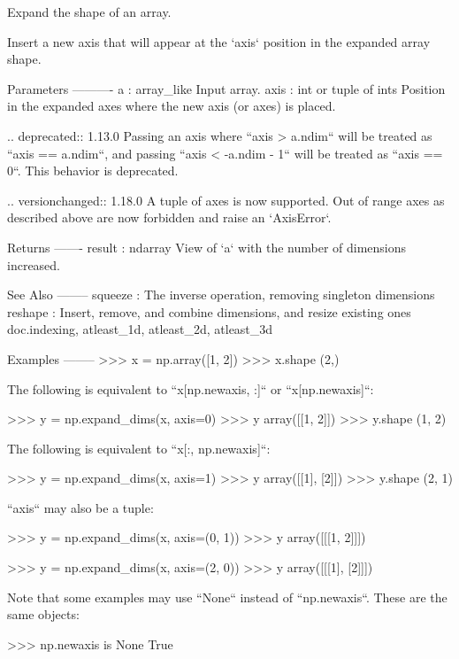 \begin{DoxyVerb}Expand the shape of an array.

Insert a new axis that will appear at the `axis` position in the expanded
array shape.

Parameters
----------
a : array_like
    Input array.
axis : int or tuple of ints
    Position in the expanded axes where the new axis (or axes) is placed.

    .. deprecated:: 1.13.0
        Passing an axis where ``axis > a.ndim`` will be treated as
        ``axis == a.ndim``, and passing ``axis < -a.ndim - 1`` will
        be treated as ``axis == 0``. This behavior is deprecated.

    .. versionchanged:: 1.18.0
        A tuple of axes is now supported.  Out of range axes as
        described above are now forbidden and raise an `AxisError`.

Returns
-------
result : ndarray
    View of `a` with the number of dimensions increased.

See Also
--------
squeeze : The inverse operation, removing singleton dimensions
reshape : Insert, remove, and combine dimensions, and resize existing ones
doc.indexing, atleast_1d, atleast_2d, atleast_3d

Examples
--------
>>> x = np.array([1, 2])
>>> x.shape
(2,)

The following is equivalent to ``x[np.newaxis, :]`` or ``x[np.newaxis]``:

>>> y = np.expand_dims(x, axis=0)
>>> y
array([[1, 2]])
>>> y.shape
(1, 2)

The following is equivalent to ``x[:, np.newaxis]``:

>>> y = np.expand_dims(x, axis=1)
>>> y
array([[1],
       [2]])
>>> y.shape
(2, 1)

``axis`` may also be a tuple:

>>> y = np.expand_dims(x, axis=(0, 1))
>>> y
array([[[1, 2]]])

>>> y = np.expand_dims(x, axis=(2, 0))
>>> y
array([[[1],
        [2]]])

Note that some examples may use ``None`` instead of ``np.newaxis``.  These
are the same objects:

>>> np.newaxis is None
True\end{DoxyVerb}
 \mbox{\label{namespacenumpy_1_1lib_1_1shape__base_ad23034fce52191e2a66250d5811f9516}} 
